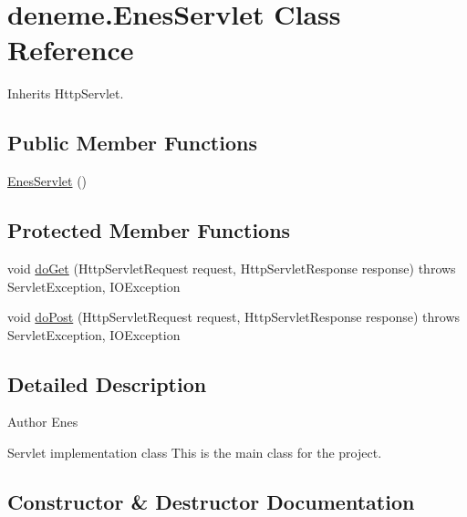 \hypertarget{classdeneme_1_1_enes_servlet}{}\section{deneme.\+Enes\+Servlet Class Reference}
\label{classdeneme_1_1_enes_servlet}


Inherits Http\+Servlet.

\subsection*{Public Member Functions}
\begin{DoxyCompactItemize}
\item 
\hyperlink{classdeneme_1_1_enes_servlet_aa00f55197ab28893aff6b819e5f9aa56}{Enes\+Servlet} ()
\end{DoxyCompactItemize}
\subsection*{Protected Member Functions}
\begin{DoxyCompactItemize}
\item 
void \hyperlink{classdeneme_1_1_enes_servlet_a9672424aafc377b7e9e6da9cec968055}{do\+Get} (Http\+Servlet\+Request request, Http\+Servlet\+Response response)  throws Servlet\+Exception, I\+O\+Exception 
\item 
void \hyperlink{classdeneme_1_1_enes_servlet_a4f94adef56457f57c27f8fbc0720c089}{do\+Post} (Http\+Servlet\+Request request, Http\+Servlet\+Response response)  throws Servlet\+Exception, I\+O\+Exception 
\end{DoxyCompactItemize}


\subsection{Detailed Description}
\begin{DoxyAuthor}{Author}
Enes
\end{DoxyAuthor}
Servlet implementation class This is the main class for the project. 

\subsection{Constructor \& Destructor Documentation}
